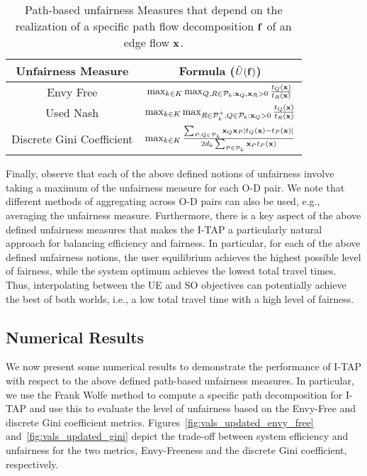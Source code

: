 \documentclass{article}
\begin{document}
\begin{table}[!] 
\centering
\caption{{\small \sf Path-based unfairness Measures that depend on the realization of a specific path flow decomposition $\mathbf{f}$ of an edge flow $\mathbf{x}$. }  }
\small
\begin{tabular}{cc}
\toprule
Unfairness Measure  & Formula ($\Tilde{U}(\mathbf{f})$) \\
\midrule 
Envy Free & $\max_{k \in K} \max_{Q, R \in \mathcal{P}_k: \mathbf{x}_Q, \mathbf{x}_R>0} \frac{t_Q(\mathbf{x})}{t_R(\mathbf{x})} $ \\
Used Nash & $\max_{k \in K}  \max_{R \in \mathcal{P}_k^+, Q\in \mathcal{P}_k: \mathbf{x}_Q>0} \frac{t_Q(\mathbf{x})}{t_R(\mathbf{x})} $ \\
Discrete Gini Coefficient & $\max_{k \in K} \frac{\sum_{P, Q \in \mathcal{P}_k} \mathbf{x}_{Q} \mathbf{x}_{P} |t_Q(\mathbf{x}) - t_P(\mathbf{x})|}{2 d_k \sum_{P \in \mathcal{P}_k} \mathbf{x}_{P} t_{P}(\mathbf{x})} $ \\
\bottomrule
\end{tabular} \label{tab:unfair-measures}
\end{table}
Finally, observe that each of the above defined notions of unfairness involve taking a maximum of the unfairness measure for each O-D pair. We note that different methods of aggregating across O-D pairs can also be used, e.g., averaging the unfairness measure. Furthermore, there is a key aspect of the above defined unfairness measures that makes the I-TAP a particularly natural approach for balancing efficiency and fairness. In particular, for each of the above defined unfairness notions, the user equilibrium achieves the highest possible level of fairness, while the system optimum achieves the lowest total travel times. Thus, interpolating between the UE and SO objectives can potentially achieve the best of both worlds, i.e., a low total travel time with a high level of fairness.

\subsection{Numerical Results} \label{sec:apdx-numerical}
We now present some numerical results to demonstrate the performance of I-TAP with respect to the above defined path-based unfairness measures. In particular, we use the Frank Wolfe method to compute a specific path decomposition for I-TAP and use this to evaluate the level of unfairness based on the Envy-Free and discrete Gini coefficient metrics. Figures~\ref{fig:vals_updated_envy_free} and~\ref{fig:vals_updated_gini} depict the trade-off between system efficiency and unfairness for the two metrics, Envy-Freeness and the discrete Gini coefficient, respectively.
\end{document}
